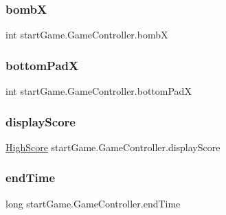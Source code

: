 \subsubsection{\texorpdfstring{bombX}{bombX}}
{\footnotesize\ttfamily int start\+Game.\+Game\+Controller.\+bombX\hspace{0.3cm}{\ttfamily [private]}}

\hypertarget{classstart_game_1_1_game_controller_a9969047b4b184c3ea25eeb4ef52dfb1e}{}\label{classstart_game_1_1_game_controller_a9969047b4b184c3ea25eeb4ef52dfb1e} 
\subsubsection{\texorpdfstring{bottom\+PadX}{bottomPadX}}
{\footnotesize\ttfamily int start\+Game.\+Game\+Controller.\+bottom\+PadX\hspace{0.3cm}{\ttfamily [private]}}

\hypertarget{classstart_game_1_1_game_controller_a645a34e4b5c875e7fe0dcedc18e8df8a}{}\label{classstart_game_1_1_game_controller_a645a34e4b5c875e7fe0dcedc18e8df8a} 
\subsubsection{\texorpdfstring{display\+Score}{displayScore}}
{\footnotesize\ttfamily \hyperlink{classview_1_1_high_score}{High\+Score} start\+Game.\+Game\+Controller.\+display\+Score\hspace{0.3cm}{\ttfamily [private]}}

\hypertarget{classstart_game_1_1_game_controller_a397d65cfee71b4063e05deb55611771f}{}\label{classstart_game_1_1_game_controller_a397d65cfee71b4063e05deb55611771f} 
\subsubsection{\texorpdfstring{end\+Time}{endTime}}
{\footnotesize\ttfamily long start\+Game.\+Game\+Controller.\+end\+Time\hspace{0.3cm}{\ttfamily [private]}}

